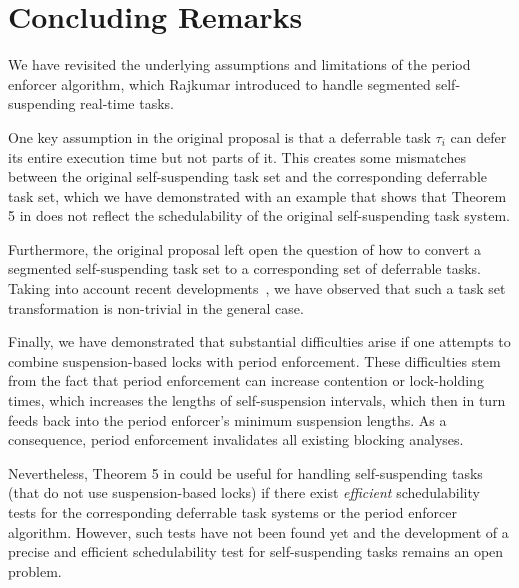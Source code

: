 
\section{Concluding Remarks}
\label{sec:conclusion}

We have revisited the underlying assumptions and limitations of the period enforcer algorithm, which Rajkumar \cite{Raj:suspension1991} introduced to handle segmented self-suspending real-time tasks. 

One key assumption in the original proposal \cite{Raj:suspension1991} is that a deferrable task $\tau_i$ can defer its entire execution time but not parts of it. This creates some mismatches between the original self-suspending task set and the corresponding deferrable task set, which we have demonstrated with an example that shows that Theorem 5 in \cite{Raj:suspension1991} does not reflect the schedulability of the original self-suspending task system. 


Furthermore, the original proposal \cite{Raj:suspension1991} left open the question of how to convert a segmented self-suspending task set to a corresponding set of deferrable tasks. Taking into account recent developments~\cite{ecrts15nelissen}, we have observed that such a task set transformation is non-trivial in the general case.  

Finally, we have demonstrated that substantial difficulties arise if one attempts to combine suspension-based locks with period enforcement. These difficulties stem from the fact that period enforcement can increase contention or lock-holding times, which increases the lengths of self-suspension intervals, which then in turn feeds back into the period enforcer's minimum suspension lengths. As a consequence, period enforcement invalidates all existing blocking analyses.

Nevertheless, Theorem 5 in \cite{Raj:suspension1991} could be useful for handling self-suspending tasks (that do not use suspension-based locks) if there exist \emph{efficient} schedulability tests for the corresponding deferrable task systems or the period enforcer algorithm. However, such tests have not been found yet and the development of a precise and efficient schedulability test for self-suspending tasks remains an open problem.



